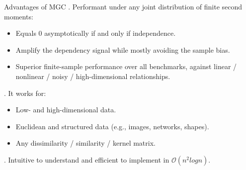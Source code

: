 \documentclass[mathserif,t]{beamer}
\newcommand{\blind}{0}
\newcommand{\Mgc}{MGC}
\begin{document}
\begin{frame}{Advantages of \Mgc}
. Performant under any joint distribution of finite second moments:
\pause
\begin{itemize}[<+->]
\item Equals $0$ asymptotically if and only if independence.
\item \textcolor{UniOrange}{Amplify the dependency signal while mostly avoiding the sample bias.} 
\item Superior finite-sample performance over all benchmarks, against linear / nonlinear / noisy / high-dimensional relationships. 
\end{itemize}

\pause
{}. It works for:
\pause
\begin{itemize}[<+->]
\item Low- and high-dimensional data.
\item Euclidean and structured data (e.g., images, networks, shapes).
\item Any dissimilarity / similarity / kernel matrix.
\end{itemize}

\pause
{}. Intuitive to understand and efficient to implement in $\mathcal{O}(n^2 log n)$.

\end{frame}

\end{document}
